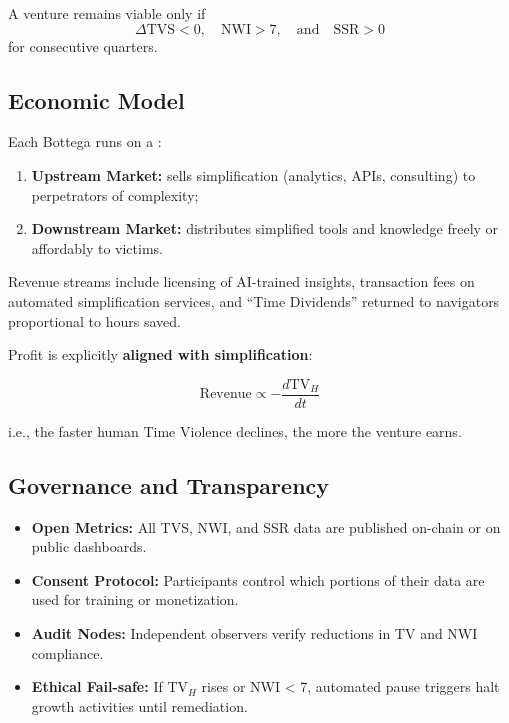 A venture remains viable only if
\begin{equation}
\label{eq:viability}
\Delta \text{TVS} < 0, \quad \text{NWI} > 7, \quad \text{and} \quad \text{SSR} > 0
\end{equation}
for consecutive quarters.

\subsection{Economic Model}
\label{sec:economic-model}

Each Bottega runs on a :

\begin{enumerate}
    \item \textbf{Upstream Market:} sells simplification (analytics, APIs, consulting) to perpetrators of complexity;
    \item \textbf{Downstream Market:} distributes simplified tools and knowledge freely or affordably to victims.
\end{enumerate}

Revenue streams include licensing of AI-trained insights, transaction fees on automated simplification services, and ``Time Dividends'' returned to navigators proportional to hours saved.

Profit is explicitly \textbf{aligned with simplification}:

\begin{equation}
\label{eq:revenue-alignment}
\text{Revenue} \propto -\frac{d\text{TV}_H}{dt}
\end{equation}

i.e., the faster human Time Violence declines, the more the venture earns.

\subsection{Governance and Transparency}
\label{sec:governance-transparency}

\begin{itemize}
    \item \textbf{Open Metrics:} All TVS, NWI, and SSR data are published on-chain or on public dashboards.
    \item \textbf{Consent Protocol:} Participants control which portions of their data are used for training or monetization.
    \item \textbf{Audit Nodes:} Independent observers verify reductions in TV and NWI compliance.
    \item \textbf{Ethical Fail-safe:} If $\text{TV}_H$ rises or NWI < 7, automated pause triggers halt growth activities until remediation.
\end{itemize}


